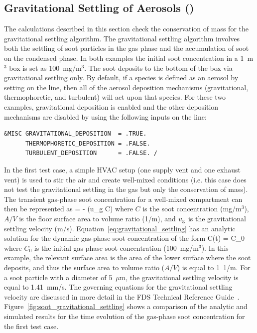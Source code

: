 \documentclass[11pt]{book}
\begin{document}
\clearpage

\subsection{Gravitational Settling of Aerosols (\texorpdfstring{}{soot\_gravitational\_settling})}
\label{soot_gravitational_settling}
\label{soot_gravitational_settling_2}

The calculations described in this section check the conservation of mass for the gravitational settling algorithm. The gravitational settling algorithm involves both the settling of soot particles in the gas phase and the accumulation of soot on the condensed phase. In both examples the initial soot concentration in a 1~m$^3$ box is set as 100~mg/m$^3$. The soot deposits to the bottom of the box via gravitational settling only. By default, if a species is defined as an aerosol by setting  on the  line, then all of the aerosol deposition mechanisms (gravitational, thermophoretic, and turbulent) will act upon that species. For these two examples, gravitational deposition is enabled and the other deposition mechanisms are disabled by using the following inputs on the  line:

\begin{lstlisting}
&MISC GRAVITATIONAL_DEPOSITION  = .TRUE.
      THERMOPHORETIC_DEPOSITION = .FALSE.
      TURBULENT_DEPOSITION      = .FALSE. /
\end{lstlisting}

\noindent In the first test case, a simple HVAC setup (one supply vent and one exhaust vent) is used to stir the air and create well-mixed conditions (i.e. this case does not test the gravitational settling in the gas but only the conservation of mass). The transient gas-phase soot concentration for a well-mixed compartment can then be represented as
\be
{} = - (u_{\rm g} C)
\label{eq:gravitational_settling}
\ee
where $C$ is the soot concentration (mg/m$^3$), $A/V$ is the floor surface area to volume ratio (\si{1/m}), and $u_{\rm g}$ is the gravitational settling velocity (m/s). Equation~\ref{eq:gravitational_settling} has an analytic solution for the dynamic gas-phase soot concentration of the form
\be
C(t) = C_0 \exp {}
\ee
where $C_0$ is the initial gas-phase soot concentration (100~mg/m$^3$). In this example, the relevant surface area is the area of the lower surface where the soot deposits, and thus the surface area to volume ratio ($A/V$) is equal to \SI{1}{1/m}. For a soot particle with a diameter of 5~$\mu$m, the gravitational settling velocity is equal to 1.41~mm/s. The governing equations for the gravitational settling velocity are discussed in more detail in the FDS Technical Reference Guide~\cite{FDS_Math_Guide}. Figure~\ref{fig:soot_gravitational_settling} shows a comparison of the analytic and simulated results for the time evolution of the gas-phase soot concentration for the first test case.
\end{document}

